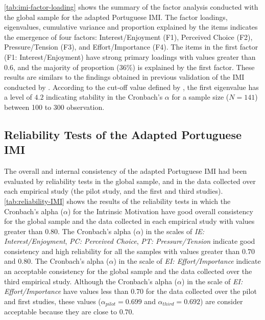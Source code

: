 \autoref{tab:imi-factor-loading} shows the summary of the factor analysis conducted with the global sample for the adapted Portuguese IMI. The factor loadings, eigenvalues, cumulative variance and proportion explained by the items indicates the emergence of four factors: Interest/Enjoyment (F1), Perceived Choice (F2), Pressure/Tension (F3), and Effort/Importance (F4). The items in the first factor (F1: Interest/Enjoyment) have strong primary loadings with values greater than 0.6, and the majority of proportion (36\%) is explained  by the first factor. These results are similars to the findings obtained in previous validation of the IMI conducted by . According to the cut-off value defined by , the first eigenvalue has a level of $4.2$ indicating stability in the Cronbach’s $\alpha$ for a sample size ($N=141$) between 100 to 300 observation.

\subsection{Reliability Tests of the Adapted Portuguese IMI}

The overall and internal consistency of the adapted Portuguese IMI had been evaluated by reliability tests in the global sample, and in the data collected over each empirical study (the pilot study, and the first and third studies). \autoref{tab:reliability-IMI} shows the results of the reliability tests in which the Cronbach's alpha ($\alpha$) for the Intrinsic Motivation have good overall consistency for the global sample and the data collected in each empirical study with values greater than 0.80. The Cronbach's alpha ($\alpha$) in the scales of \emph{IE: Interest/Enjoyment}, \emph{PC: Perceived Choice}, \emph{PT: Pressure/Tension} indicate good consistency and high reliability for all the samples with values greater than $0.70$ and $0.80$. The Cronbach's alpha ($\alpha$) in the scale of \emph{EI: Effort/Importance} indicate an acceptable consistency for the global sample and the data collected over the third empirical study. Although the Cronbach's alpha ($\alpha$) in the scale of \emph{EI: Effort/Importance} have values less than 0.70 for the data collected over the pilot and first studies, these values ($\alpha_{pilot} = 0.699$ and $\alpha_{third} = 0.692$) are consider acceptable because they are close to $0.70$.


